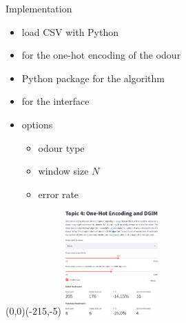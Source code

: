 \begin{frame}{Implementation}
	\begin{itemize}
		\item
		load CSV with Python

		\item
		 for the one-hot encoding of the odour
		
		\item
		Python package  for the algorithm
		
		\item
		 for the interface
		
		\item
		options
		\begin{itemize}
			\item
			odour type
			
			\item
			window size $N$
			
			\item
			error rate
		\end{itemize}
	\end{itemize}

	\begin{picture}(0,0)(-215,-5)
		\includegraphics[height=4cm]{images/overview.png}
	\end{picture}
\end{frame}


